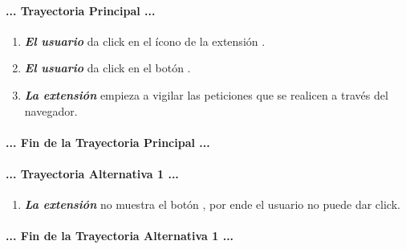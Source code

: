\documentclass[12pt, a4paper, titlepage]{report}
\newcommand*{\img}[1]{%
    \raisebox{-.3\baselineskip}{%
        \texttt{[image: \#1]}%
    }%
}
\begin{document}
				\paragraph{... Trayectoria Principal ...}
				\begin{enumerate}
					\item \textbf{\textit{El usuario}} da click en el ícono de la extensión \img{imagenes/Desarrollo/Prototipo_1/escom.png}.
					\item \textbf{\textit{El usuario}} da click en el botón \img{imagenes/Desarrollo/Prototipo_1/boton_activar.png}.
					\item \textbf{\textit{La extensión}} empieza a vigilar las peticiones que se realicen a través del navegador.
				\end{enumerate}
				\paragraph{... Fin de la Trayectoria Principal ...}
				
				\paragraph{... Trayectoria Alternativa 1 ...}
				\begin{enumerate}
				    \item \textbf{\textit{La extensión}} no muestra el botón \img{imagenes/Desarrollo/Prototipo_1/boton_activar.png}, por ende el usuario no puede dar click.
				\end{enumerate}
				\paragraph{... Fin de la Trayectoria Alternativa 1 ...}
				
				\newpage
				
\end{document}
